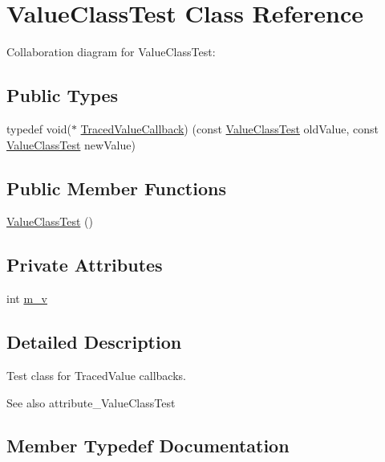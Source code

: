 \hypertarget{classValueClassTest}{}\section{Value\+Class\+Test Class Reference}
\label{classValueClassTest}


Collaboration diagram for Value\+Class\+Test\+:
\subsection*{Public Types}
\begin{DoxyCompactItemize}
\item 
typedef void($\ast$ \hyperlink{classValueClassTest_aec75b84ef15cfed1b643ed975025d675}{Traced\+Value\+Callback}) (const \hyperlink{classValueClassTest}{Value\+Class\+Test} old\+Value, const \hyperlink{classValueClassTest}{Value\+Class\+Test} new\+Value)
\end{DoxyCompactItemize}
\subsection*{Public Member Functions}
\begin{DoxyCompactItemize}
\item 
\hyperlink{classValueClassTest_a364614344df448d1ceef0b126ede1ad7}{Value\+Class\+Test} ()
\end{DoxyCompactItemize}
\subsection*{Private Attributes}
\begin{DoxyCompactItemize}
\item 
int \hyperlink{classValueClassTest_a3a7b7e82d6c11938e6d9fcc4c87a42fd}{m\+\_\+v}
\end{DoxyCompactItemize}


\subsection{Detailed Description}
Test class for Traced\+Value callbacks. \begin{DoxySeeAlso}{See also}
attribute\+\_\+\+Value\+Class\+Test 
\end{DoxySeeAlso}


\subsection{Member Typedef Documentation}
